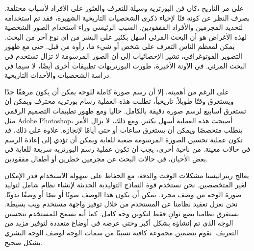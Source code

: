 على مر التاريخ ،كان فن البورتريه وسيلة للتعرف والعثور على الأفراد لأسباب مختلفة. بصرف النظر عن كونه فنًا لإحياء ذكرى الشخصيات التاريخية الشهيرة، فقد تم استخدامه لتحديد المجرمين والأفراد المفقودين. السبب الرئيسي وراء استخدام الصور الشخصية لهذه الأغراض هو أن البحث المرئي أسهل بكثير على البشر من أي نوع آخر من البحث. يمكن لمعظم الناس التعرف على شخص أو شيء ما، رأوه من قبل. حتى مع ظهور التصوير الفوتوغرافي، تشير الإحصائيات إلى أن الصور المرسومة لا تزال تستخدم في البحث المرئي. في الآونة الأخيرة، طورت البورتريهات تطبيقات أخرى أيضًا، لا سيما في دراسة الشخصيات والأحداث التاريخية.

على الرغم من أهميته، إلا أن رسم صورة كاملة للوجه يمكن أن يكون مرهقًا جدًا ويستغرق وقتًا طويلاً. تاريخياً، تطلبت هذه العملية رسام بورتريه محترف ويمكن أن تستغرق أسابيع لرسم صورة دقيقة بالكامل. حاليا ومع ظهور تطبيقات التصميم الرقمي مثل Adobe Photoshop، أصبحت هذه العملية أسهل بكثير. ومع ذلك، لا يزال الأمر يتطلب متخصصًا ويمكن أن يستغرق ساعات أو حتى أيامًا لإنجازه. علاوة على ذلك، قد تكون عملية تحسين الصورة المرسومة صعبة للغاية ويمكن أن تؤدي إلى إعادة الرسم في حالات معينة. من ناحية أخرى، يجب أن تكون عملية رسم البورتريه سريعة للغاية في بعض الأحيان، في حالات البحث عن مجرمين خطرين أو أطفال مفقودين.

يعالج ريتراتيستا مشكلات الوقت والدقة، مع الحفاظ على سهولة الاستخدام قدر الإمكان لغير المتخصصين. نحن نستخدم قوة النماذج التوليدية الحديثة لإنشاء نظام شامل لتوليد صورة الوجه من  وصف مجرد. يمكن أن يكون هذا الوصف صوتًا أو نصًا أو وصفًا يدويًا. نحن نعزل تعقيد نظامنا عن المستخدم من خلال توفير واجهة مستخدم ويب بسيطة. يستغرق نظامنا بضع ثوانٍ فقط لتكوين وجه كامل. كما أنه يسمح للمستخدم بتحسين الوجه الذي تم إنشاؤه بشكل أكبر وحتى عرضه في أوضاع متعددة لتوفير مزيد من التعريف. نقوم بتضمين مجموعة كافية نسبيًا من سمات الوجه لوصف الوجه البشري بشكل صحيح.
